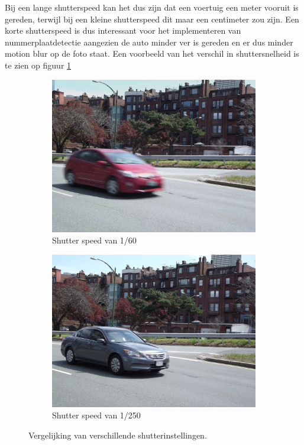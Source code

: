 Bij een lange shutterspeed kan het dus zijn dat een voertuig een meter vooruit is gereden, terwijl bij een kleine shutterspeed dit maar een centimeter zou zijn. Een korte shutterspeed is dus interessant voor het implementeren van nummerplaatdetectie aangezien de auto minder ver is gereden en er dus minder motion blur op de foto staat. Een voorbeeld van het verschil in shuttersnelheid is te zien op figuur \ref{fig:ntlpc}
%
\begin{figure}[h!]
	\centering
	\begin{subfigure}[b]{0.4\linewidth}
		\includegraphics[width=\linewidth]{img/shutter-slow.jpg}
		\caption{Shutter speed van 1/60}
	\end{subfigure}
	\begin{subfigure}[b]{0.4\linewidth}
		\includegraphics[width=\linewidth]{img/shutter-fast.jpg}
		\caption{Shutter speed van 1/250}
	\end{subfigure}
	\caption{Vergelijking van verschillende shutterinstellingen. \autocite{easy2019shutter}}
	\label{fig:ntlpc}
\end{figure}


